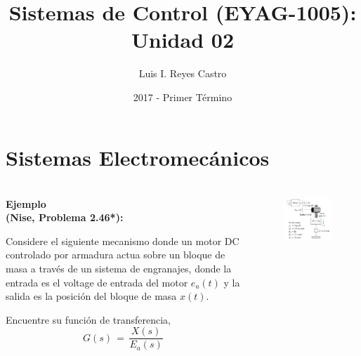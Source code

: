 \documentclass[ 10pt, xcolor = dvipsnames]{beamer}
\title[Sistemas de Control: Unidad 02]{Sistemas de Control (EYAG-1005): \textbf{Unidad 02} }
\author[L. I. Reyes Castro]{Luis I. Reyes Castro}
\institute[ESPOL]{\normalsize Escuela Superior Polit\'ecnica del Litoral (ESPOL) \\ Guayaquil - Ecuador}
\date[2017-T1]{2017 - Primer T\'ermino}
\begin{document}


\section{Sistemas Electromec\'anicos}

\begin{frame}[allowframebreaks]
\frametitle{\insertsection}

\begin{columns}

\begin{column}{0.45\textwidth}
\textbf{Ejemplo \\ (Nise, Problema 2.46*):}
\halfskip

Considere el siguiente mecanismo donde un motor DC controlado por armadura actua sobre un bloque de masa a trav\'es de un sistema de engranajes, donde la entrada es el voltage de entrada del motor $e_a(t)$ y la salida es la posici\'on del bloque de masa $x(t)$. 
\halfskip

Encuentre su funci\'on de transferencia, \iec
\[
G(s) \, = \, \frac{X(s)}{E_a(s)}
\]

\end{column}

\begin{column}{0.45\textwidth}
\begin{figure}[htb]
\centering
\includegraphics[width=\columnwidth]{nise_prob-2-46.jpeg}
\end{figure}
\end{column}

\end{columns}
\framebreak

\begin{figure}[htb]
\centering
\def\svgwidth{0.9\columnwidth}

\end{figure}

\end{frame}
\end{document}

